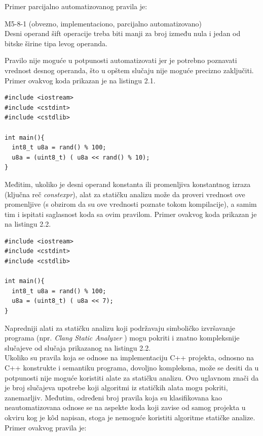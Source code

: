 \documentclass[12pt,oneside]{memoir}
\begin{document}
Primer parcijalno automatizovanog pravila je: 

\begin{center}

\begin{tcolorbox}
 M5-8-1 (obvezno, implementaciono, parcijalno automatizovano) \\
Desni operand šift operacije treba biti manji za broj između nula i jedan
od bitske širine tipa levog operanda.

\end{tcolorbox}
\end{center}
  \noindent
  Pravilo nije moguće u potpunosti automatizovati jer je potrebno poznavati vrednost desnog operanda, što u opštem slučaju nije
  moguće precizno zaključiti. Primer ovakvog koda prikazan je na listingu 2.1. \\


\begin{lstlisting}[style=customc, caption={K\^{o}d za koji stati\v{c}ka analiza u op\v{s}tem slu\v{c}aju ne mo\v{z}e da d\^{a} precizne rezultate.},label={lst:label1}]
#include <iostream>
#include <cstdint>
#include <cstdlib>

int main(){
  int8_t u8a = rand() % 100;
  u8a = (uint8_t) ( u8a << rand() % 10);
}
\end{lstlisting}
Međitim, ukoliko je desni operand konstanta ili promenljiva konstantnog izraza (klju\v{c}na re\v{c} \textit{constexpr}), alat za stati\v{c}ku analizu mo\v{z}e da proveri vrednost ove promenljive (s obzirom da su ove vrednosti poznate tokom kompilacije), a samim tim i ispitati saglasnost koda sa ovim pravilom.
  Primer ovakvog koda prikazan je na listingu 2.2. \\

\begin{lstlisting}[style=customc, caption={K\^{o}d čija se ispravnost jednostavno može utvrditi statičkom analizom.},label={lst:label2}]
#include <iostream>
#include <cstdint>
#include <cstdlib>

int main(){
  int8_t u8a = rand() % 100;
  u8a = (uint8_t) ( u8a << 7);
}
\end{lstlisting}

  Napredniji alati za statičku analizu koji podržavaju simboličko izvršavanje programa (npr. \textit{Clang Static Analyzer} \cite{CSAWebsite}) mogu pokriti i znatno kompleksnije 
  slučajeve od slučaja prikazanog na listingu 2.2.
  \\
  \indent 
  Ukoliko su pravila koja se odnose na implementaciju C++ projekta, odnosno na C++ konstrukte i semantiku programa, dovoljno kompleksna, može se desiti da u potpunosti nije moguće koristiti alate za statičku analizu. Ovo uglavnom znači da je broj slučajeva upotrebe koji algoritmi iz statičkih alata mogu pokriti, zanemarljiv. Međutim, određeni broj pravila koja su klasifikovana kao neautomatizovana odnose se na aspekte koda koji zavise od samog projekta
  u okviru kog je k\^{o}d napisan, stoga je nemoguće koristiti algoritme statičke analize.
  Primer ovakvog pravila je:
\end{document}
